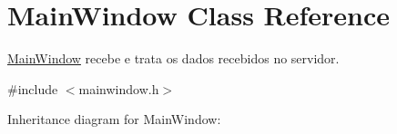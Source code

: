 \hypertarget{classMainWindow}{}\section{Main\+Window Class Reference}
\label{classMainWindow}


\hyperlink{classMainWindow}{Main\+Window} recebe e trata os dados recebidos no servidor.  




{\ttfamily \#include $<$mainwindow.\+h$>$}



Inheritance diagram for Main\+Window\+:
